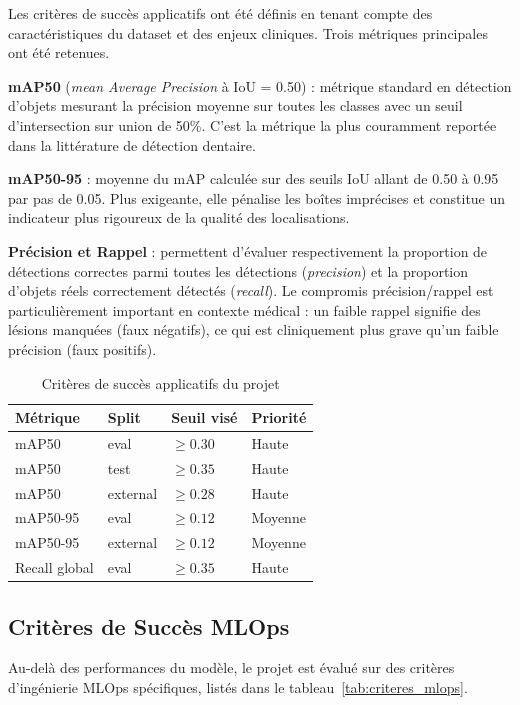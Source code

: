 \documentclass{rapportENSIAS}
\begin{document}
Les critères de succès applicatifs ont été définis en tenant compte des caractéristiques du dataset et des enjeux cliniques. Trois métriques principales ont été retenues.

\textbf{mAP50} (\textit{mean Average Precision} à IoU = 0.50) : métrique standard en détection d'objets mesurant la précision moyenne sur toutes les classes avec un seuil d'intersection sur union de 50\%. C'est la métrique la plus couramment reportée dans la littérature de détection dentaire.

\textbf{mAP50-95} : moyenne du mAP calculée sur des seuils IoU allant de 0.50 à 0.95 par pas de 0.05. Plus exigeante, elle pénalise les boîtes imprécises et constitue un indicateur plus rigoureux de la qualité des localisations.

\textbf{Précision et Rappel} : permettent d'évaluer respectivement la proportion de détections correctes parmi toutes les détections (\textit{precision}) et la proportion d'objets réels correctement détectés (\textit{recall}). Le compromis précision/rappel est particulièrement important en contexte médical : un faible rappel signifie des lésions manquées (faux négatifs), ce qui est cliniquement plus grave qu'un faible précision (faux positifs).

\begin{table}[H]
\centering
\caption{Critères de succès applicatifs du projet}
\label{tab:criteres_succes}
\begin{tabular}{llll}
\toprule
\textbf{Métrique} & \textbf{Split} & \textbf{Seuil visé} & \textbf{Priorité} \\
\midrule
mAP50         & eval     & $\geq 0.30$ & Haute \\
mAP50         & test     & $\geq 0.35$ & Haute \\
mAP50         & external & $\geq 0.28$ & Haute \\
mAP50-95      & eval     & $\geq 0.12$ & Moyenne \\
mAP50-95      & external & $\geq 0.12$ & Moyenne \\
Recall global & eval     & $\geq 0.35$ & Haute \\
\bottomrule
\end{tabular}
\end{table}

\subsection{Critères de Succès MLOps}

Au-delà des performances du modèle, le projet est évalué sur des critères d'ingénierie MLOps spécifiques, listés dans le tableau~\ref{tab:criteres_mlops}.
\end{document}
